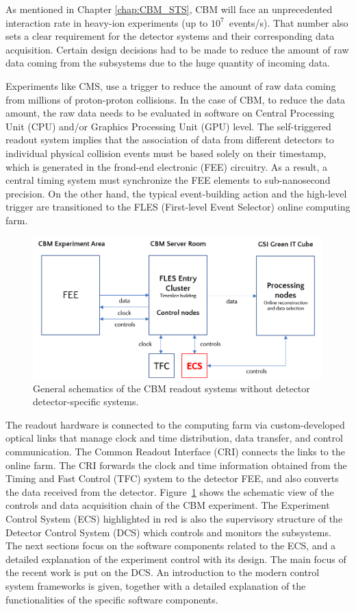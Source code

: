 
As mentioned in Chapter \ref{chap:CBM_STS}, \gls{CBM} will face an unprecedented interaction rate in heavy-ion experiments (up to $10^{7}$~events/s). That number also sets a clear requirement for the detector systems and their corresponding data acquisition. Certain design decisions had to be made to reduce the amount of raw data coming from the subsystems due to the huge quantity of incoming data.

Experiments like \gls{CMS}, use a trigger to \cite{CMS-DAQ} reduce the amount of raw data coming from millions of proton-proton collisions.  In the case of \gls{CBM}, to reduce the data amount, the raw data needs to be evaluated in software on Central Processing Unit (\gls{CPU}) and/or Graphics Processing Unit (\gls{GPU}) level. The self-triggered readout system implies that the association of data from different detectors to individual physical collision events must be based solely on their timestamp, which is generated in the frond-end electronic (\gls{FEE}) circuitry. As a result, a central timing system must synchronize the \gls{FEE} elements to sub-nanosecond precision. On the other hand, the typical event-building action and the high-level trigger are transitioned to the \gls{FLES} (First-level Event Selector) online computing farm. 


\begin{figure}[!h]
\centering
\includegraphics[width=0.65\columnwidth]{Chapter3/Controls/images/online.png}
\caption{General schematics of the CBM readout systems without detector detector-specific systems.}
\label{fig_controls}
\end{figure}

\newpage
The readout hardware is connected to the computing farm via custom-developed optical links that manage clock and time distribution, data transfer, and control communication. The Common Readout Interface (\gls{CRI}) connects the links to the online farm. The \gls{CRI} forwards the clock and time information obtained from the Timing and Fast Control (\gls{TFC}) system to the detector \gls{FEE}, and also converts the data received from the detector. Figure~\ref{fig_controls} shows the schematic view of the controls and data acquisition chain of the \gls{CBM} experiment. The Experiment Control System (\gls{ECS}) highlighted in red is also the supervisory structure of the Detector Control System (\gls{DCS}) which controls and monitors the subsystems. The next sections focus on the software components related to the \gls{ECS}, and a detailed explanation of the experiment control with its design. The main focus of the recent work is put on the \gls{DCS}. An introduction to the modern control system frameworks is given, together with a detailed explanation of the functionalities of the specific software components. 
